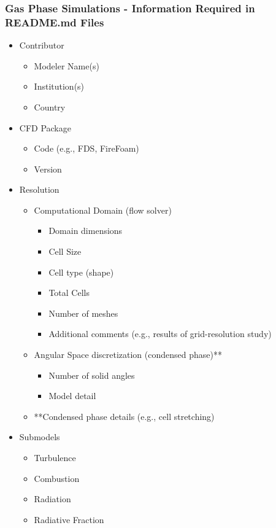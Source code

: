 \documentclass[12pt]{article}
\begin{document}
\subsubsection{Gas Phase Simulations - Information Required in README.md Files}
\begin{itemize}[noitemsep]
 \item Contributor
 	\begin{itemize}[noitemsep]
	 \item Modeler Name(s)
	\item Institution(s)
	\item Country
 	\end{itemize}
 \item CFD Package
 	\begin{itemize}[noitemsep]
 	\item Code (e.g., FDS, FireFoam)
	\item Version
 	\end{itemize} 	
 \item Resolution
 	\begin{itemize}[noitemsep]
 	\item Computational Domain (flow solver)
 		\begin{itemize}[noitemsep]
  		\item Domain dimensions
	 	\item Cell Size
	 	\item Cell type (shape)
	 	\item Total Cells
	 	\item Number of meshes
	 	\item Additional comments (e.g., results of grid-resolution study)
	 	\end{itemize}
 	\item Angular Space discretization (condensed phase)**
 		\begin{itemize}[noitemsep]
  		\item Number of solid angles 
	 	\item Model detail
 	 	\end{itemize}
 	\item **Condensed phase details (e.g., cell stretching)
 	\end{itemize}
 \item Submodels
 	\begin{itemize}[noitemsep]
 	\item Turbulence
 	\item Combustion
 	\item Radiation 
 	\item Radiative Fraction

\end{itemize}
\end{itemize}
\end{document}
